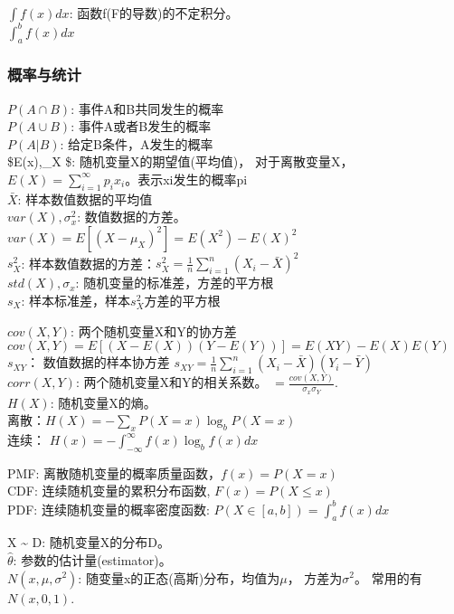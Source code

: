 \documentclass[11pt]{article}
\begin{document}
\(\int f(x)dx\): 函数f(F的导数)的不定积分。\\
\(\int_{a}^{b}f(x)dx\)

    \subsubsection{概率与统计}\label{ux6982ux7387ux4e0eux7edfux8ba1}

    \(P(A\cap B)\): 事件A和B共同发生的概率\\
\(P(A\cup B)\): 事件A或者B发生的概率\\
\(P(A|B)\): 给定B条件，A发生的概率\\
\$E(x),\mu\_X \$: 随机变量X的期望值(平均值)， 对于离散变量X，
\(E(X)=\sum_{i=1}^{\infty}p_ix_i\)。表示xi发生的概率pi\\
\(\bar{X}\): 样本数值数据的平均值\\
\(var(X), \sigma_x^2\):
数值数据的方差。\(var(X)=E[(X-\mu_X)^2] = E(X^2) - E(X)^2\)\\
\(s_X^2\):
样本数值数据的方差：\(s_X^2 = \frac{1}{n}\sum_{i=1}^{n}(X_i- \bar{X})^2\)\\
\(std(X), \sigma_x\): 随机变量的标准差，方差的平方根\\
\(s_X\): 样本标准差，样本\(s_X^2\)方差的平方根

\(cov(X, Y)\): 两个随机变量X和Y的协方差
\(cov(X,Y) = E[(X-E(X))(Y-E(Y))] = E(XY)-E(X)E(Y)\)\\
\(s_{XY}\)： 数值数据的样本协方差
\(s_{XY} = \frac{1}{n}\sum_{i=1}^{n}(X_i-\bar{X})(Y_i-\bar{Y})\)\\
\(corr(X, Y)\): 两个随机变量X和Y的相关系数。
\(=\frac{cov(X, Y)}{\sigma_x \sigma_Y}\).\\
\(H(X)\): 随机变量X的熵。\\
离散：\(H(X)=-\sum_xP(X=x)\log_bP(X=x)\)\\
连续： \(H(x)=-\int_{-\infty}^{\infty}f(x)\log_bf(x)dx\)

PMF: 离散随机变量的概率质量函数，\(f(x)=P(X=x)\)\\
CDF: 连续随机变量的累积分布函数, \(F(x)=P(X\leq x)\)\\
PDF: 连续随机变量的概率密度函数: \(P(X\in [a,b]) = \int_{a}^{b}f(x)dx\)

X \textasciitilde{} D: 随机变量X的分布D。\\
\(\hat{\theta}\): 参数的估计量(estimator)。\\
\(N(x, \mu, \sigma^2)\): 随变量x的正态(高斯)分布，均值为\(\mu\)，
方差为\(\sigma^2\)。 常用的有\(N(x, 0, 1)\).
\end{document}
